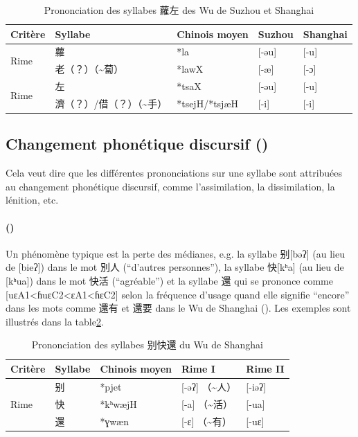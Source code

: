 \documentclass{scrbook}
\newcounter{c}[subsubsection]
\newcommand{\stpc}[1]{\stepcounter{#1}}
\newcommand{\bolang}{\textasciitilde}
\newcommand{\illustre}{Les exemples sont illustrés dans la table\xspace}
\begin{document}
\begin{sloppypar}
\begin{table}[htbp]
  \centering
    \begin{tabular}{lllll}
    \toprule
    Critère & Syllabe & Chinois moyen  & Suzhou & Shanghai \\
    \midrule
    \multirow{2}[2]{*}{Rime} & 蘿 & *la   & [-əu] & [-u] \\
          & 老（？）（\bolang 蔔） & *lawX & [-æ]  & [-ɔ] \\
    \midrule
    \multirow{2}[2]{*}{Rime}
          & 左 & *tsaX & [-əu] & [-u] \\
          & 濟（？）/借（？）（\bolang 手） & *tsejH/*tsjæH & [-i]  & [-i] \\
    \bottomrule
    \end{tabular}%
  \caption{Prononciation des syllabes 蘿左 des Wu de Suzhou et Shanghai}
  \label{tab:exemple_etymon}%
\end{table}%

\subsection{Changement phonétique discursif (\cite[134--136]{Shen1988shanghai})}\label{phenom3}
Cela veut dire que les différentes prononciations sur une syllabe sont attribuées au changement phonétique discursif, comme l'assimilation, la dissimilation, la lénition, etc.

\stpc{c}\paragraph{()}
Un phénomène typique est la perte des médianes, e.g. la syllabe 别[bəʔ] (au lieu de [bieʔ]) dans le mot 別人 (``d'autres personnes''), la syllabe 快[kʰa] (au lieu de [kʰua]) dans le mot 快活 (``agréable'') et la syllabe 還 qui se prononce comme [uɛA1<ɦuɛC2<ɛA1<ɦɛC2] selon la fréquence d'usage quand elle signifie ``encore'' dans les mots comme 還有 et 還要 dans le Wu de Shanghai (\cite[134]{Shen1988shanghai}). \illustre \ref{tab:exemple_mediane}.

\begin{table}[htbp]
  \centering
    \begin{tabular}{lllll}
    \toprule
    Critère & Syllabe & Chinois moyen  & Rime I & Rime II \\
    \midrule
    \multirow{3}[2]{*}{Rime} & 别 & *pjet & [-əʔ] （\bolang 人） & [-iəʔ] \\
          & 快 & *kʰwæjH & [-a] （\bolang 活）  & [-ua] \\    
          & 還 & *ɣwæn & [-ɛ] （\bolang 有）  & [-uɛ] \\
    \bottomrule
    \end{tabular}%
  \caption{Prononciation des syllabes 别快還 du Wu de Shanghai}
  \label{tab:exemple_mediane}%
\end{table}%


\end{sloppypar}
\end{document}
